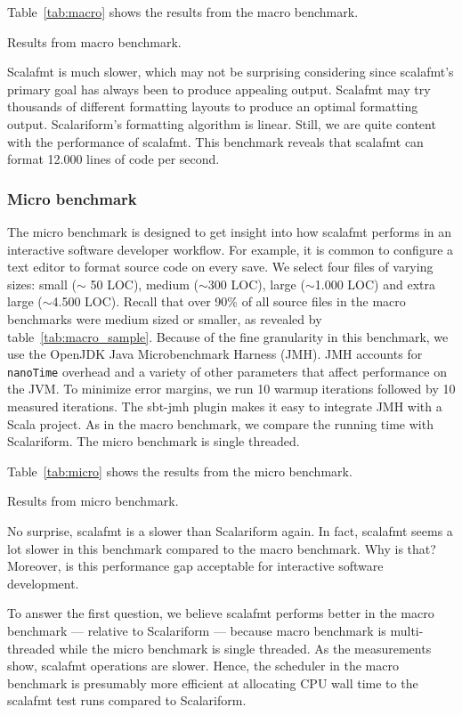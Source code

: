 Table~\ref{tab:macro} shows the results from the macro benchmark.
\begin{table}
  \centering
  
  \caption{Results from macro benchmark.}\label{tab:macro}
\end{table}
Scalafmt is much slower, which may not be surprising considering since scalafmt's primary goal has always been to produce appealing output.
Scalafmt may try thousands of different formatting layouts to produce an optimal formatting output.
Scalariform's formatting algorithm is linear.
Still, we are quite content with the performance of scalafmt.
This benchmark reveals that scalafmt can format 12.000 lines of code per second.


\subsubsection{Micro benchmark}
The micro benchmark is designed to get insight into how scalafmt performs in an interactive software developer workflow.
For example, it is common to configure a text editor to format source code on every save.
We select four files of varying sizes: small ($\sim$ 50 LOC), medium ($\sim$300 LOC), large ($\sim$1.000 LOC) and extra large ($\sim$4.500 LOC).
Recall that over 90\% of all source files in the macro benchmarks were medium sized or smaller, as revealed by table~\ref{tab:macro_sample}.
Because of the fine granularity in this benchmark, we use the OpenJDK Java Microbenchmark Harness (JMH)\autocite{OpenJ38:online}.
JMH accounts for \texttt{nanoTime} overhead and a variety of other parameters that affect performance on the JVM.
To minimize error margins, we run 10 warmup iterations followed by 10 measured iterations.
The sbt-jmh\autocite{ktoso84:online} plugin makes it easy to integrate JMH with a Scala project.
As in the macro benchmark, we compare the running time with Scalariform.
The micro benchmark is single threaded.

Table~\ref{tab:micro} shows the results from the micro benchmark.
\begin{table}
  \centering
  
  \caption{Results from micro benchmark.}\label{tab:micro}
\end{table}
No surprise, scalafmt is a slower than Scalariform again.
In fact, scalafmt seems a lot slower in this benchmark compared to the macro benchmark.
Why is that?
Moreover, is this performance gap acceptable for interactive software development.

To answer the first question, we believe scalafmt performs better in the macro benchmark --- relative to Scalariform --- because macro benchmark is multi-threaded while the micro benchmark is single threaded.
As the measurements show, scalafmt operations are slower.
Hence, the scheduler in the macro benchmark is presumably more efficient at allocating CPU wall time to the scalafmt test runs compared to Scalariform.

